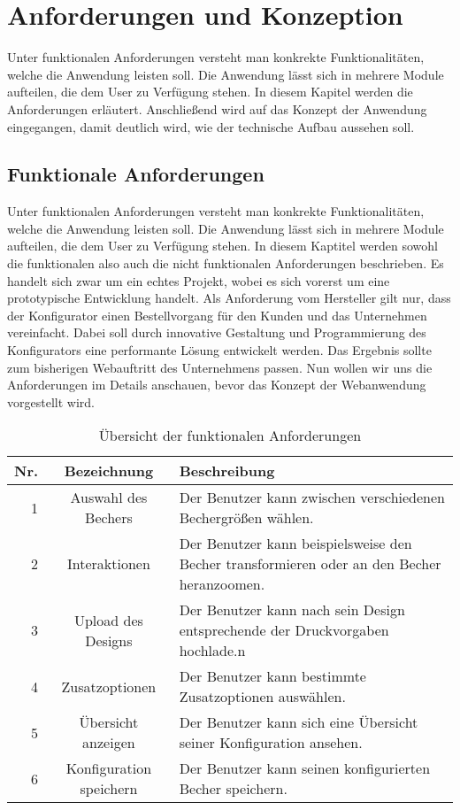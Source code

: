 %
%
%
\chapter{Anforderungen und Konzeption}
\label{cha:methodik}
%
Unter funktionalen Anforderungen versteht man konkrekte Funktionalitäten, welche die Anwendung leisten soll. Die Anwendung lässt sich in mehrere Module aufteilen, die dem User zu Verfügung stehen. In diesem Kapitel werden die Anforderungen erläutert. Anschließend wird auf das Konzept der Anwendung eingegangen, damit deutlich wird, wie der technische Aufbau aussehen soll.
%
%
%
%
\section{Funktionale Anforderungen}
\label{sec:problemanalyse}
%
Unter funktionalen Anforderungen versteht man konkrekte Funktionalitäten, welche die Anwendung leisten soll. Die Anwendung lässt sich in mehrere Module aufteilen, die dem User zu Verfügung stehen. In diesem Kaptitel werden sowohl die funktionalen also auch die nicht funktionalen Anforderungen beschrieben. Es handelt sich zwar um ein echtes Projekt, wobei es sich vorerst um eine prototypische Entwicklung handelt. Als Anforderung vom Hersteller gilt nur, dass der Konfigurator einen Bestellvorgang für den Kunden und das Unternehmen vereinfacht. Dabei soll durch innovative Gestaltung und Programmierung des Konfigurators eine performante Lösung entwickelt werden. Das Ergebnis sollte zum bisherigen Webauftritt des Unternehmens passen. Nun wollen wir uns die Anforderungen im Details anschauen, bevor das Konzept der Webanwendung vorgestellt wird.

\renewcommand{\arraystretch}{1.8}
\begin{table}[h]
	\begin{tabular}{|r|c|p{8.5cm}|}
		\hline
		\textbf{Nr.} & \textbf{Bezeichnung} & \textbf{Beschreibung} \\
		\hline
		1 & Auswahl des Bechers & Der Benutzer kann zwischen verschiedenen Bechergrößen wählen. \\
		\hline
		2 & Interaktionen & Der Benutzer kann beispielsweise den Becher transformieren oder an den Becher heranzoomen. \\
		\hline
		3 & Upload des Designs & Der Benutzer kann nach sein Design entsprechende der Druckvorgaben hochlade.n \\
		\hline
		4 & Zusatzoptionen & Der Benutzer kann bestimmte Zusatzoptionen auswählen. \\
		\hline
		5 & Übersicht anzeigen & Der Benutzer kann sich eine Übersicht seiner Konfiguration ansehen. \\
		\hline
		6 & Konfiguration speichern & Der Benutzer kann seinen konfigurierten Becher speichern. \\
		\hline
	\end{tabular}
\caption{Übersicht der funktionalen Anforderungen}
\end{table}
%
